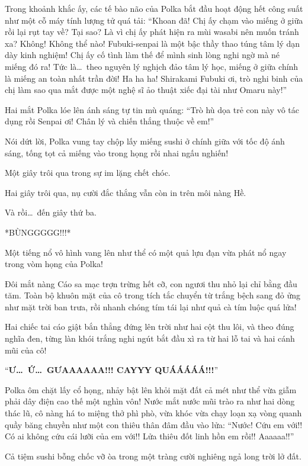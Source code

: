\documentclass[../main.tex]{subfiles}
\begin{document}
Trong khoảnh khắc ấy, các tế bào não của Polka bắt đầu hoạt động hết công suất như một cỗ máy tính lượng tử quá tải: ``Khoan đã! Chị ấy chạm vào miếng ở giữa rồi lại rụt tay về? Tại sao? Là vì chị ấy phát hiện ra mùi wasabi nên muốn tránh xa? Không! Không thể nào! Fubuki-senpai là một bậc thầy thao túng tâm lý dạn dày kinh nghiệm! Chị ấy cố tình làm thế để mình sinh lòng nghi ngờ mà né miếng đó ra! Tức là\dots\ theo nguyên lý nghịch đảo tâm lý học, miếng ở giữa chính là miếng an toàn nhất trần đời! Ha ha ha! Shirakami Fubuki ơi, trò nghi binh của chị làm sao qua mắt được một nghệ sĩ ảo thuật xiếc đại tài như Omaru này!''

Hai mắt Polka lóe lên ánh sáng tự tin mù quáng: ``Trò hù dọa trẻ con này vô tác dụng rồi Senpai ơi! Chân lý và chiến thắng thuộc về em!''

Nói dứt lời, Polka vung tay chộp lấy miếng sushi ở chính giữa với tốc độ ánh sáng, tống tọt cả miếng vào trong họng rồi nhai ngấu nghiến!

Một giây trôi qua trong sự im lặng chết chóc.

Hai giây trôi qua, nụ cười đắc thắng vẫn còn in trên môi nàng Hề.

Và rồi\dots\ đến giây thứ ba.

*BÙNGGGGG!!!*

Một tiếng nổ vô hình vang lên như thể có một quả lựu đạn vừa phát nổ ngay trong vòm họng của Polka!

Đôi mắt nàng Cáo sa mạc trợn trừng hết cỡ, con ngươi thu nhỏ lại chỉ bằng đầu tăm. Toàn bộ khuôn mặt của cô trong tích tắc chuyển từ trắng bệch sang đỏ ửng như mặt trời ban trưa, rồi nhanh chóng tím tái lại như quả cà tím luộc quá lửa!

Hai chiếc tai cáo giật bắn thẳng đứng lên trời như hai cột thu lôi, và theo đúng nghĩa đen, từng làn khói trắng nghi ngút bắt đầu xì ra từ hai lỗ tai và hai cánh mũi của cô!

``\textbf{Ư\dots\ Ứ\dots\ GƯAAAAAA!!! CAYYY QUÁÁÁÁÁ!!!}''

Polka ôm chặt lấy cổ họng, nhảy bật lên khỏi mặt đất cả mét như thể vừa giẫm phải dây điện cao thế một nghìn vôn! Nước mắt nước mũi trào ra như hai dòng thác lũ, cô nàng há to miệng thở phì phò, vừa khóc vừa chạy loạn xạ vòng quanh quầy băng chuyền như một con thiêu thân đâm đầu vào lửa: ``Nước! Cứu em với!! Có ai không cứu cái lưỡi của em với!! Lửa thiêu đốt linh hồn em rồi!! Aaaaaa!!''

Cả tiệm sushi bỗng chốc vỡ òa trong một tràng cười nghiêng ngả long trời lở đất.
\end{document}
